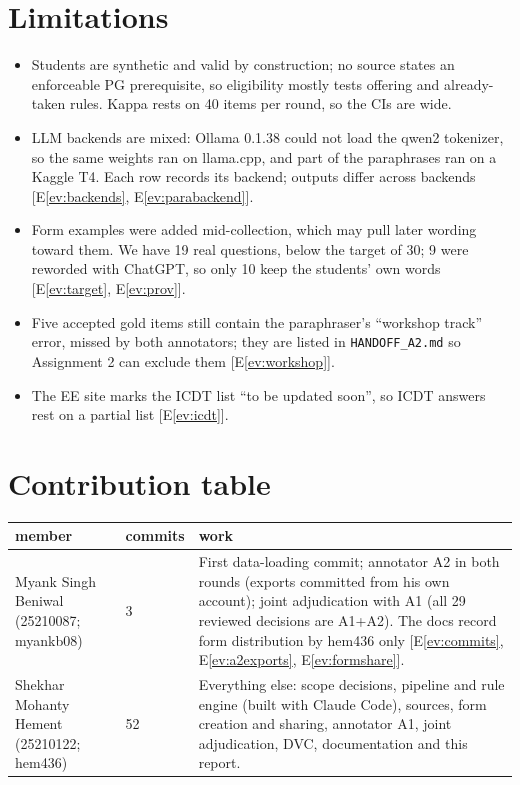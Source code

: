 \documentclass[11pt,a4paper]{article}
\newcommand{\f}[1]{\nolinkurl{#1}}
\newcounter{ev}
\newcommand{\ev}[1]{E\ref{ev:#1}}
\newcommand{\nforms}{19}
\newcommand{\nformsself}{10}
\newcommand{\nformsproxy}{9}
\newcommand{\ncommitsH}{52}
\newcommand{\ncommitsM}{3}
\begin{document}
\section{Limitations}
\begin{itemize}
\item Students are synthetic and valid by construction; no source states an enforceable PG prerequisite, so
  eligibility mostly tests offering and already-taken rules. Kappa rests on 40 items per round, so the CIs are wide.
\item LLM backends are mixed: Ollama 0.1.38 could not load the qwen2 tokenizer, so the same weights ran on llama.cpp,
  and part of the paraphrases ran on a Kaggle T4. Each row records its backend; outputs differ across backends
  [\ev{backends}, \ev{parabackend}].
\item Form examples were added mid-collection, which may pull later wording toward them. We have \nforms{} real
  questions, below the target of 30; \nformsproxy{} were reworded with ChatGPT, so only \nformsself{} keep the
  students' own words [\ev{target}, \ev{prov}].
\item Five accepted gold items still contain the paraphraser's ``workshop track'' error, missed by both annotators;
  they are listed in \f{HANDOFF_A2.md} so Assignment 2 can exclude them [\ev{workshop}].
\item The EE site marks the ICDT list ``to be updated soon'', so ICDT answers rest on a partial list [\ev{icdt}].
\end{itemize}

\section{Contribution table}
\begin{center}\small{}
\begin{tabular}{@{}>{\raggedright\arraybackslash}p{4.3cm}p{1.3cm}>{\raggedright\arraybackslash}p{10.7cm}@{}}
\toprule
member & commits & work \\
\midrule
Myank Singh Beniwal (25210087; myankb08) & \ncommitsM & First data-loading commit; annotator A2 in both rounds (exports committed from his
own account); joint adjudication with A1 (all 29 reviewed decisions are A1+A2). The docs record form distribution by
hem436 only [\ev{commits}, \ev{a2exports}, \ev{formshare}]. \\
Shekhar Mohanty Hement (25210122; hem436) & \ncommitsH & Everything else: scope decisions, pipeline and rule engine (built with Claude
Code), sources, form creation and sharing, annotator A1, joint adjudication, DVC, documentation and this report. \\
\bottomrule
\end{tabular}
\end{center}
\label{endofbody}
\end{document}
